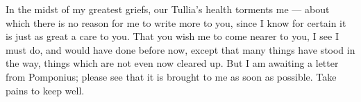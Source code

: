 

 In the midst of my greatest griefs, our Tullia's health torments me --- about which there is no reason for me to write more to you, since I know for certain it is just as great a care to you. That you wish me to come nearer to you, I see I must do, and would have done before now, except that many things have stood in the way, things which are not even now cleared up. But I am awaiting a letter from Pomponius; please see that it is brought to me as soon as possible. Take pains to keep well.
